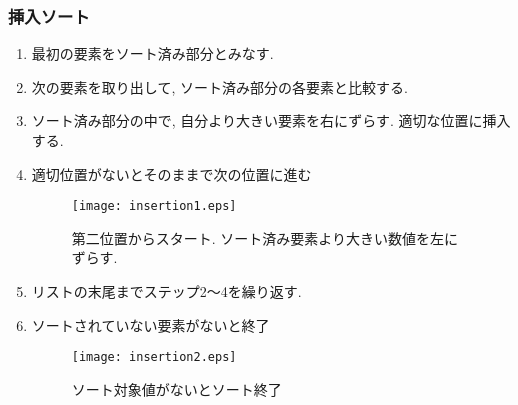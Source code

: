 \documentclass[a4j, 11pt]{jarticle}
\begin{document}
\subsubsection{挿入ソート}
\begin{enumerate}
  \item 最初の要素をソート済み部分とみなす. 
  \item 次の要素を取り出して, ソート済み部分の各要素と比較する. 
  \item ソート済み部分の中で, 自分より大きい要素を右にずらす. 適切な位置に挿入する. 
  \item 適切位置がないとそのままで次の位置に進む
  \begin{figure}[H]
    \centering
    \texttt{[image: insertion1.eps]}
    \caption{第二位置からスタート. ソート済み要素より大きい数値を左にずらす.}
  \end{figure}
  \item リストの末尾までステップ2〜4を繰り返す. 
  \item ソートされていない要素がないと終了
  \begin{figure}[H]
    \centering
    \texttt{[image: insertion2.eps]}
    \caption{ソート対象値がないとソート終了}
  \end{figure}
\end{enumerate}
\end{document}
